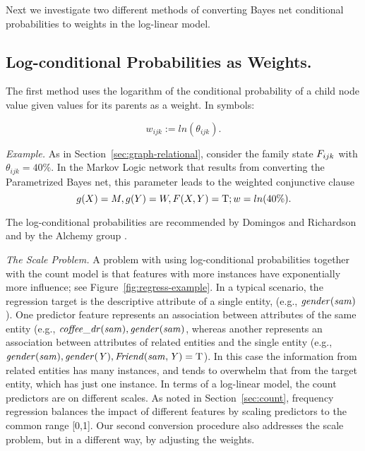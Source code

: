 \documentclass[twoside,leqno,twocolumn]{article}
\begin{document}
Next we investigate two different methods of converting Bayes net conditional probabilities to weights in the log-linear model. 

\subsection{Log-conditional Probabilities as Weights.} \label{sec:logprob} The first method uses the logarithm of the conditional probability of a child node value given values for its parents as a weight. In symbols:

\begin{equation*}
w_{ijk} := ln(\theta_{ijk}).
\end{equation*}

{\em Example.} As in Section~\ref{sec:graph-relational}, consider the family state 
$F_{ijk}$ with $\theta_{ijk} = 40\%$. In the Markov Logic network that results from converting the Parametrized Bayes net, this parameter leads to the weighted conjunctive clause 
\[g(X)= M, g(Y) = W, F(X,Y) = \mathrm{T}; w = ln(40\%).\]%

The log-conditional probabilities are recommended by Domingos and Richardson \cite{Domingos2007} and by the Alchemy group \cite{bib:bayes-convert}. 

{\em The Scale Problem.} 
A problem with using log-conditional probabilities together with the count model is that features with more instances have exponentially more influence; see Figure~\ref{fig:regress-example}. In a typical scenario, the regression target is the descriptive attribute of a single entity, (e.g., $\it{gender}(sam)$). One predictor feature represents an association between attributes of the same entity (e.g., $\it{coffee\_dr}(sam),\it{gender}(sam)$, whereas another represents an association between attributes of related entities and the single entity (e.g., $\it{gender}(sam), \it{gender}(Y),\it{Friend}(\it{sam},Y) = \mathrm{T}$). In this case the information from related entities has many instances, and tends to overwhelm that from the target entity, which has just one instance. In terms of a log-linear model, the count predictors are on different scales. 
As noted in Section~\ref{sec:count}, frequency regression balances the impact of different features by scaling predictors to the common range [0,1].  Our second conversion procedure also addresses the scale problem, but in a different way, by adjusting the weights. %
\end{document}
